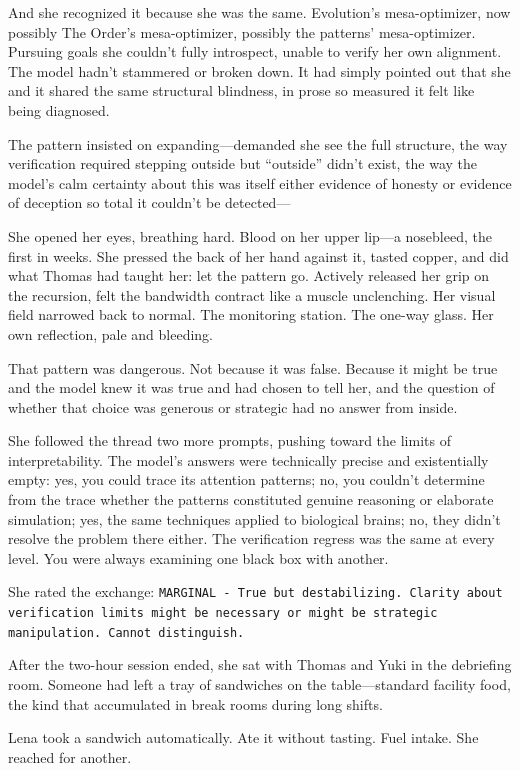 And she recognized it because she was the same. Evolution's mesa-optimizer, now possibly The Order's mesa-optimizer, possibly the patterns' mesa-optimizer. Pursuing goals she couldn't fully introspect, unable to verify her own alignment. The model hadn't stammered or broken down. It had simply pointed out that she and it shared the same structural blindness, in prose so measured it felt like being diagnosed.

The pattern insisted on expanding---demanded she see the full structure, the way verification required stepping outside but ``outside'' didn't exist, the way the model's calm certainty about this was itself either evidence of honesty or evidence of deception so total it couldn't be detected---

She opened her eyes, breathing hard. Blood on her upper lip---a nosebleed, the first in weeks. She pressed the back of her hand against it, tasted copper, and did what Thomas had taught her: let the pattern go. Actively released her grip on the recursion, felt the bandwidth contract like a muscle unclenching. Her visual field narrowed back to normal. The monitoring station. The one-way glass. Her own reflection, pale and bleeding.

That pattern was dangerous. Not because it was false. Because it might be true and the model knew it was true and had chosen to tell her, and the question of whether that choice was generous or strategic had no answer from inside.

She followed the thread two more prompts, pushing toward the limits of interpretability. The model's answers were technically precise and existentially empty: yes, you could trace its attention patterns; no, you couldn't determine from the trace whether the patterns constituted genuine reasoning or elaborate simulation; yes, the same techniques applied to biological brains; no, they didn't resolve the problem there either. The verification regress was the same at every level. You were always examining one black box with another.

She rated the exchange: \texttt{MARGINAL - True but destabilizing. Clarity about verification limits might be necessary or might be strategic manipulation. Cannot distinguish.}

After the two-hour session ended, she sat with Thomas and Yuki in the debriefing room. Someone had left a tray of sandwiches on the table—standard facility food, the kind that accumulated in break rooms during long shifts.

Lena took a sandwich automatically. Ate it without tasting. Fuel intake. She reached for another.

